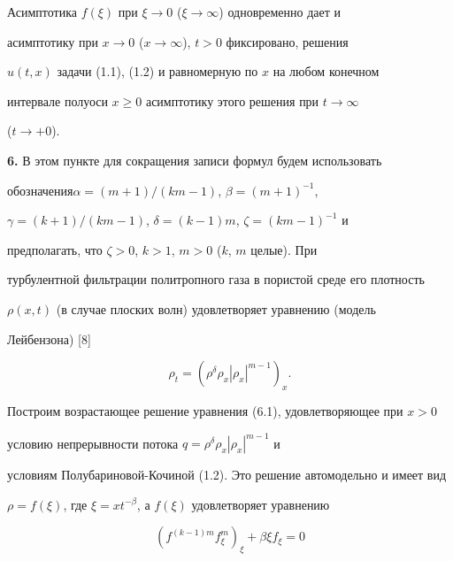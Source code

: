  


\begin{notenonum} 


Асимптотика $f(\xi)$ при $\xi\to0$ ($\xi\to\infty$) одновременно дает и 


асимптотику при $x\to0$ ($x\to\infty$), $t>0$ фиксировано, решения 


$u(t,x)$ задачи (1.1), (1.2) и равномерную по $x$ на любом конечном 


интервале полуоси $x\ge0$ асимптотику этого решения при $t\to\infty$ 


($t\to+0$). 


\end{notenonum} 


\addtocounter{section}{1} 


\setcounter{equation}{0}


 


{\bf 6.} В этом пункте для сокращения записи формул будем использовать 


обозначения\linebreak $\alpha=(m+1)/(km-1)$, $\beta=(m+1)^{-1}$, 


$\gamma=(k+1)/(km-1)$, $\delta=(k-1)m$, $\zeta=(km-1)^{-1}$ и 


предполагать, что $\zeta>0$, $k>1$, $m>0$ ($k$, $m$ целые). При 


турбулентной фильтрации политропного газа в пористой среде его плотность 


$\rho(x,t)$ (в случае плоских волн) удовлетворяет уравнению (модель 


Лейбензона) [8] 


\begin{equation} 


\rho_t=(\rho^\delta \rho_x|\rho_x|^{m-1})_x. 


\end{equation} 


Построим возрастающее решение уравнения (6.1), удовлетворяющее при $x>0$ 


условию непрерывности потока $q=\rho^\delta \rho_x|\rho_x|^{m-1}$ и 


условиям Полубариновой-Кочиной (1.2). Это решение автомодельно и имеет вид 


$\rho=f(\xi)$, где $\xi=x t^{-\beta}$, а $f(\xi)$ удовлетворяет уравнению 


\begin{equation} 


(f^{(k-1)m}f^m_\xi)_\xi+\beta\xi f_\xi=0 


\end{equation} 


